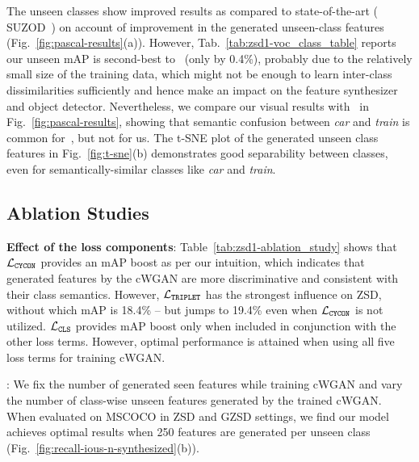 \documentclass{bmvc2k}
\begin{document}
 The unseen classes show improved results as compared to state-of-the-art ( SUZOD~\cite{hayat2020synthesizing}) on account of improvement in the generated unseen-class features (Fig.~\ref{fig:pascal-results}(a)). However, Tab.~\ref{tab:zsd1-voc_class_table} reports our unseen mAP is second-best to~\cite{hayat2020synthesizing} (only by 0.4\%), probably due to the relatively small size of the training data, which might not be enough to learn inter-class dissimilarities sufficiently and hence make an impact on the feature synthesizer and object detector. Nevertheless, we compare our visual results with~\cite{hayat2020synthesizing} in Fig.~\ref{fig:pascal-results}, showing that semantic confusion between {\em car} and {\em train} is common for~\cite{hayat2020synthesizing}, but not for us. The t-SNE plot of the generated unseen class features in Fig.~\ref{fig:t-sne}(b) demonstrates good separability between classes, even for semantically-similar classes like {\em car} and {\em train}. 



\subsection{Ablation Studies} 
\label{sec:ablation}
\textbf{Effect of the loss components}: Table~\ref{tab:zsd1-ablation_study} shows that $\mathcal{L}_{\tt CYCON}$ provides an mAP boost as per our intuition, which indicates that generated features by the cWGAN are more discriminative and consistent with their class semantics. However, $\mathcal{L}_{\tt TRIPLET}$ has the strongest influence on ZSD, without which mAP is 18.4\% -- but jumps to 19.4\% even when $\mathcal{L}_{\tt CYCON}$ is not utilized. $\mathcal{L}_{\tt CLS}$ provides mAP boost only when included in conjunction with the other loss terms. However, optimal performance is attained when using all five loss terms for training cWGAN.  



: We fix the number of generated seen features while training cWGAN and vary the number of class-wise unseen features generated by the trained cWGAN. When evaluated on MSCOCO in ZSD and GZSD settings, we find our model achieves optimal results when 250 features are generated per unseen class (Fig.~\ref{fig:recall-ious-n-synthesized}(b)). 
\end{document}
